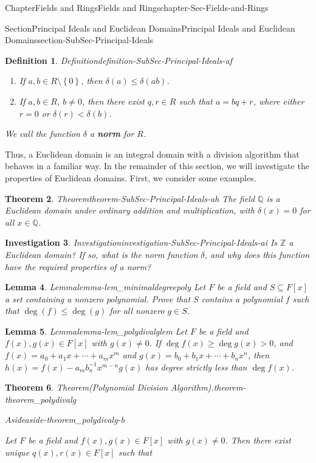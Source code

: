 \documentclass[oneside,10pt,]{book}
\newcommand{\terminology}[1]{\textbf{#1}}
\numberwithin{equation}{section}
\renewcommand{\le}{\leqslant}
\renewcommand{\ge}{\geqslant}
\newcommand{\set}[1]{\left\{ {#1} \right\}}
\def\Z{{\mathbb Z}}
\def\Q{{\mathbb Q}}
\newtheorem{theorem}{Theorem}[section]
\newtheorem{lemma}[theorem]{Lemma}
\newtheorem{definition}[theorem]{Definition}
\newtheorem{investigation}[theorem]{Investigation}
\newcommand{\lt}{<}
\begin{document}
\begin{chapterptx}{Chapter}{Fields and Rings}{}{Fields and Rings}{}{}{chapter-Sec-Fields-and-Rings}
\begin{sectionptx}{Section}{Principal Ideals and Euclidean Domains}{}{Principal Ideals and Euclidean Domains}{}{}{section-SubSec-Principal-Ideals}
\begin{definition}{Definition}{}{definition-SubSec-Principal-Ideals-af}
\begin{enumerate}
\item{}If \(a,b\in R\setminus \set{0}\), then \(\delta(a) \le \delta(ab)\).%
\item{}If \(a,b\in R\), \(b\ne 0\), then there exist \(q,r\in R\) such that \(a = bq+r\), where either \(r = 0\) or \(\delta(r) \lt \delta(b)\).%
\end{enumerate}
%
\par
We call the function \(\delta\) a \terminology{norm} for \(R\).%
\end{definition}
Thus, a Euclidean domain is an integral domain with a division algorithm that behaves in a familiar way. In the remainder of this section, we will investigate the properties of Euclidean domains. First, we consider some examples.%
\begin{theorem}{Theorem}{}{}{theorem-SubSec-Principal-Ideals-ah}%
The field \(\Q\) is a Euclidean domain under ordinary addition and multiplication, with \(\delta(x) = 0\) for all \(x\in \Q\).%
\end{theorem}
\begin{investigation}{Investigation}{}{investigation-SubSec-Principal-Ideals-ai}%
Is \(\Z\) a Euclidean domain? If so, what is the norm function \(\delta\), and why does this function have the required properties of a norm?%
\end{investigation}%
\begin{lemma}{Lemma}{}{}{lemma-lem_minimaldegreepoly}%
Let \(F\) be a field and \(S\subseteq F[x]\) a set containing a nonzero polynomial. Prove that \(S\) contains a polynomial \(f\) such that \(\deg(f) \le \deg(g)\) for all nonzero \(g\in S\).%
\end{lemma}
\begin{lemma}{Lemma}{}{}{lemma-lem_polydivalglem}%
Let \(F\) be a field and \(f(x),g(x)\in F[x]\) with \(g(x)\ne 0\). If \(\deg f(x) \ge \deg g(x) > 0\), and \(f(x) = a_0 + a_1 x + \cdots + a_m x^m\) and \(g(x) = b_0 + b_1 x + \cdots + b_n x^n\), then \(h(x) = f(x) - a_m b_n^{-1} x^{m-n} g(x)\) has degree strictly less than \(\deg f(x)\).%
\end{lemma}
\begin{theorem}{Theorem}{(Polynomial Division Algorithm).}{}{theorem-theorem_polydivalg}%
\begin{aside}{Aside}{}{aside-theorem_polydivalg-b}%
\end{aside}
Let \(F\) be a field and \(f(x),g(x)\in F[x]\) with \(g(x)\ne 0\). Then there exist unique \(q(x),
r(x) \in F[x]\) such that%
\begin{equation*}

\end{equation*}
\end{theorem}
\end{sectionptx}
\end{chapterptx}
\end{document}
